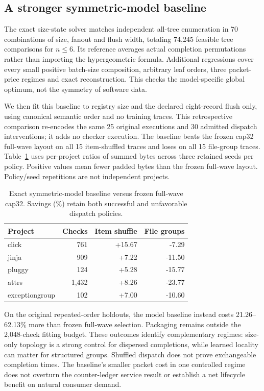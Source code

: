 \documentclass[10pt,journal,compsoc]{IEEEtran}
\theoremstyle{definition}\newtheorem{definition}[theorem]{Definition}
\begin{document}
\subsection{A stronger symmetric-model baseline}
The exact size-state solver matches independent all-tree enumeration in
70 combinations of size, fanout and flush width, totaling 74,245 feasible
tree comparisons for $n\le6$. Its reference averages actual completion
permutations rather than importing the hypergeometric formula. Additional
regressions cover every small positive batch-size composition, arbitrary
leaf orders, three packet-price regimes and exact reconstruction. This
checks the model-specific global optimum, not the symmetry of software data.

We then fit this baseline to registry size and the declared eight-record
flush only, using canonical semantic order and no training traces.
This retrospective comparison re-encodes the same 25 original executions
and 30 admitted dispatch interventions; it adds no checker execution.
The baseline beats the frozen cap32 full-wave layout on all 15 item-shuffled
traces and loses on all 15 file-group traces. Table~\ref{tab:v14-symmetry}
uses per-project ratios of summed bytes across three retained seeds per
policy. Positive values mean fewer padded bytes than the frozen full-wave
layout. Policy/seed repetitions are not independent projects.

\begin{table}[t]\centering\small
\caption{Exact symmetric-model baseline versus frozen full-wave cap32.
Savings (\%) retain both successful and unfavorable dispatch policies.}
\label{tab:v14-symmetry}
\begin{tabular}{@{}lrrr@{}}\toprule
Project & Checks & Item shuffle & File groups\\\midrule
click & 761 & +15.67 & -7.29\\
jinja & 909 & +7.22 & -11.50\\
pluggy & 124 & +5.28 & -15.77\\
attrs & 1,432 & +8.26 & -23.77\\
exceptiongroup & 102 & +7.00 & -10.60\\
\bottomrule\end{tabular}
\end{table}

On the original repeated-order holdouts, the model baseline instead costs
21.26--62.13\% more than frozen full-wave selection. Packaging remains
outside the 2,048-check fitting budget. These outcomes identify complementary
regimes: size-only topology is a strong control for dispersed completions,
while learned locality can matter for structured groups. Shuffled dispatch
does not prove exchangeable completion times. The baseline's smaller packet
cost in one controlled regime does not overturn the counter-ledger service
result or establish a net lifecycle benefit on natural consumer demand.
\end{document}
